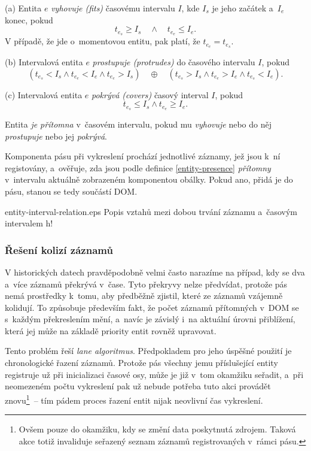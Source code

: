 				\begin{mydef}
					\label{def:fits}
					(a) Entita $e$ \emph{vyhovuje (fits)} časovému intervalu $I$, kde $I_s$ je jeho začátek a~$I_e$ konec, pokud $$t_{e_s} \ge I_s\quad\wedge\quad t_{e_e} \le I_e.$$
					V případě, že jde o~momentovou entitu, pak platí, že $t_{e_e} = t_{e_s}$.
				\end{mydef}
				\begin{mydef}
					(b) Intervalová entita $e$ \emph{prostupuje (protrudes)} do časového intervalu $I$, pokud $$(t_{e_s} < I_s \wedge  t_{e_e} < I_e \wedge  t_{e_e} > I_s) \quad\oplus\quad (t_{e_s} > I_s \wedge  t_{e_e} > I_e \wedge  t_{e_s} < I_e).$$
				\end{mydef}
				\begin{mydef}
					(c) Intervalová entita $e$ \emph{pokrývá (covers)} časový interval $I$, pokud $$t_{e_s} \le I_s \wedge  t_{e_e} \ge I_e.$$
				\end{mydef}
				\begin{mydef}
					\label{entity-presence}
					Entita \emph{je přítomna} v~časovém intervalu, pokud mu \emph{vyhovuje} nebo do něj \emph{prostupuje} nebo jej \emph{pokrývá}.
				\end{mydef}
				
				Komponenta pásu při vykreslení prochází jednotlivé záznamy, jež jsou k~ní registovány, a~ověřuje, zda jsou podle definice \ref{entity-presence} \emph{přítomny} v~intervalu aktuálně zobrazeném komponentou obálky. Pokud ano, přidá je do pásu, stanou se tedy součástí DOM.
				
				{}
				{entity-interval-relation.eps}
				{Popis vztahů mezi dobou trvání záznamu a~časovým intervalem}
				{h!}
				
			\subsubsection*{Řešení kolizí záznamů}
				V historických datech pravděpodobně velmi často narazíme na případ, kdy se dva a~více záznamů překrývá v~čase. Tyto překryvy nelze předvídat, protože pás nemá prostředky k~tomu, aby předběžně zjistil, které ze záznamů vzájemně kolidují. To způsobuje především fakt, že počet záznamů přítomných v~DOM se s~každým překreslením mění, a~navíc je závislý i~na aktuální úrovni přiblížení, která jej může na základě priority entit rovněž upravovat.
				
				Tento problém řeší \emph{lane algoritmus}. Předpokladem pro jeho úspěšné použití je chronologické řazení záznamů. Protože pás všechny jemu příslušející entity registruje už při inicializaci časové osy, může je již v~tom okamžiku seřadit, a~při neomezeném počtu vykreslení pak už nebude potřeba tuto akci provádět znovu\footnote{Ovšem pouze do okamžiku, kdy se změní data poskytnutá zdrojem. Taková akce totiž invaliduje seřazený seznam záznamů registrovaných v~rámci pásu.}~-- tím pádem proces řazení entit nijak neovlivní čas vykreslení. 
				
